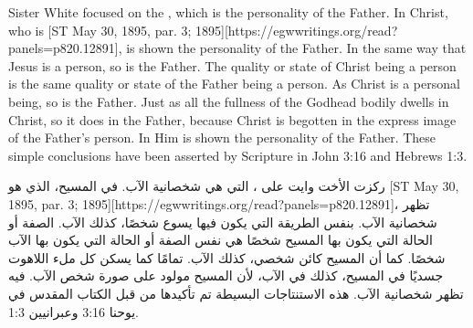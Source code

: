 \begin{table}[H]
\centering
\renewcommand{\arraystretch}{1.5}
\setlength{\tabcolsep}{15pt}
\end{table}


Sister White focused on the , which is the personality of the Father. In Christ, who is [ST May 30, 1895, par. 3; 1895][https://egwwritings.org/read?panels=p820.12891], is shown the personality of the Father. In the same way that Jesus is a person, so is the Father. The quality or state of Christ being a person is the same quality or state of the Father being a person. As Christ is a personal being, so is the Father. Just as all the fullness of the Godhead bodily dwells in Christ, so it does in the Father, because Christ is begotten in the express image of the Father’s person. In Him is shown the personality of the Father. These simple conclusions have been asserted by Scripture in John 3:16 and Hebrews 1:3.


ركزت الأخت وايت على ، التي هي شخصانية الآب. في المسيح، الذي هو [ST May 30, 1895, par. 3; 1895][https://egwwritings.org/read?panels=p820.12891]، تظهر شخصانية الآب. بنفس الطريقة التي يكون فيها يسوع شخصًا، كذلك الآب. الصفة أو الحالة التي يكون بها المسيح شخصًا هي نفس الصفة أو الحالة التي يكون بها الآب شخصًا. كما أن المسيح كائن شخصي، كذلك الآب. تمامًا كما يسكن كل ملء اللاهوت جسديًا في المسيح، كذلك في الآب، لأن المسيح مولود على صورة شخص الآب. فيه تظهر شخصانية الآب. هذه الاستنتاجات البسيطة تم تأكيدها من قبل الكتاب المقدس في يوحنا 3:16 وعبرانيين 1:3.


